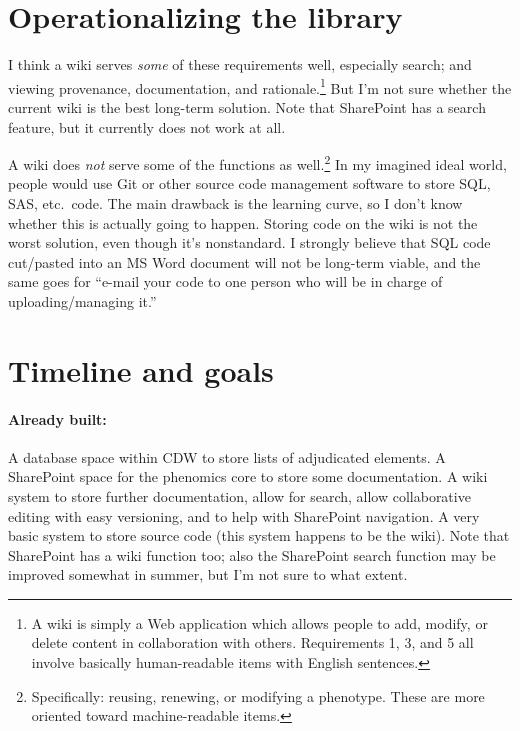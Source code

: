 \documentclass{tufte-handout}
\begin{document}
\section{Operationalizing the library}

I think a wiki serves \emph{some} of these requirements well,
especially search; and viewing provenance, documentation, and
rationale.\footnote{A wiki is simply a Web application which allows
  people to add, modify, or delete content in collaboration with
  others. Requirements 1, 3, and 5 all involve basically
  human-readable items with English sentences.} But I'm not sure
whether the current wiki is the best long-term solution. Note that SharePoint
has a search feature, but it currently does not work at all.

A wiki does \emph{not} serve some of the functions as
well.\footnote{Specifically: reusing, renewing, or modifying
a phenotype. These are more oriented toward machine-readable items.}
In my imagined ideal world, people would use Git or other source code
management software to store SQL, SAS, etc.\ code. The main drawback is the
learning curve, so I don't know whether this is actually going to
happen. Storing code on the wiki is not the worst solution, even
though it's nonstandard. I strongly believe that SQL code cut/pasted
into an MS Word document will not be long-term viable, and the same
goes for ``e-mail your code to one person who will be in charge of
uploading/managing it.''


\section{Timeline and goals}

\paragraph{Already built:}
A database space within CDW to store lists of adjudicated elements. A
SharePoint space for the phenomics core to store some documentation. A
wiki system to store further documentation, allow for search, allow
collaborative editing with easy versioning, and to help with SharePoint
navigation. A very basic system to store source code (this system happens to be
the wiki). Note that SharePoint has a wiki function too; also the
SharePoint search function may be improved somewhat in summer, but I'm
not sure to what extent.
\end{document}
